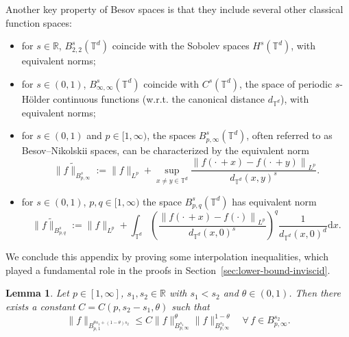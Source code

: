 \documentclass[11pt,oneside,reqno]{amsart}
\newcommand{\assign}{:=}
\newcommand{\mathd}{\mathrm{d}}
\newtheorem{lemma}[theorem]{Lemma}
\numberwithin{equation}{section}
\begin{document}
Another key property of Besov spaces is that they include several other
classical function spaces:
\begin{itemize}
  \item for $s \in \mathbb{R}$, $B^s_{2, 2} (\mathbb{T}^d)$ coincide with the
  Sobolev spaces $H^s (\mathbb{T}^d)$, with equivalent norms;
  
  \item for $s \in (0, 1)$, $B^s_{\infty, \infty} (\mathbb{T}^d)$ coincide
  with $C^s (\mathbb{T}^d)$, the space of periodic $s$-H\"{o}lder continuous
  functions (w.r.t. the canonical distance $d_{\mathbb{T}^d}$), with
  equivalent norms;
  
  \item for $s \in (0, 1)$ and $p \in [1, \infty)$, the spaces $B^s_{p,
  \infty} (\mathbb{T}^d)$, often referred to as Besov--Nikolskii spaces, can
  be characterized by the equivalent norm
  \[ \|f \tilde{\|}_{B^s_{p, \infty}} \assign \| f \|_{L^p} + \sup_{x \neq y
     \in \mathbb{T}^d} \frac{\left\| f \left( \cdot \, + x \right) - f \left(
     \cdot \, + y \right) \right\|_{L^p}}{d_{\mathbb{T}^d} (x, y)^s} . \]
  \item for $s \in (0, 1)$, $p, q \in [1, \infty)$ the space $B^s_{p, q}
  (\mathbb{T}^d)$ has equivalent norm
  \[ \|f \tilde{\|}_{B^s_{p, q}} \assign \| f \|_{L^p} + \int_{\mathbb{T}^d}
     \left( \frac{\left\| f \left( \cdot \, + x \right) - f (\cdot)
     \right\|_{L^p}}{d_{\mathbb{T}^d} (x, 0)^s} \right)^q 
     \frac{1}{d_{\mathbb{T}^d} (x, 0)^d} \mathd x. \]
\end{itemize}


We conclude this appendix by proving some interpolation inequalities, which
played a fundamental role in the proofs in
Section~\ref{sec:lower-bound-inviscid}.

\begin{lemma}
  \label{lem:interpolation-besov}Let $p \in [1, \infty]$, $s_1, s_2 \in
  \mathbb{R}$ with $s_1 < s_2$ and $\theta \in (0, 1)$. Then there exists a
  constant $C = C (p, s_2 - s_1, \theta)$ such that
  \begin{equation}
    \| f \|_{B^{\theta s_1 + (1 - \theta) s_2}_{p, 1}} \leqslant C \| f
    \|_{B^{s_1}_{p, \infty}}^{\theta}  \| f \|^{1 - \theta}_{B^{s_2}_{p,
    \infty}}  \quad \forall \, f \in B^{s_2}_{p, \infty} .
    \label{eq:interpolation-besov}
  \end{equation}
\end{lemma}
\end{document}
